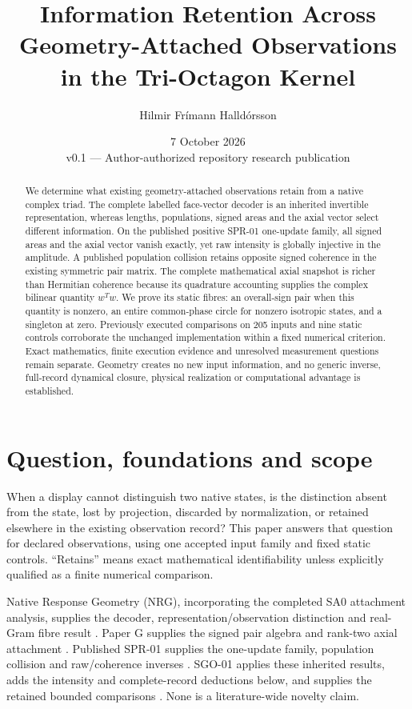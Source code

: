 \documentclass[11pt,a4paper]{article}
\title{\vspace{-12mm}\textbf{Information Retention Across\\Geometry-Attached Observations\\in the Tri-Octagon Kernel}}
\author{Hilmir Fr\'imann Halld\'orsson}
\date{7 October 2026\\\small v0.1 --- Author-authorized repository research publication}
\begin{document}
\maketitle\thispagestyle{fancy}
\begin{abstract}
We determine what existing geometry-attached observations retain from a native complex triad. The complete labelled face-vector decoder is an inherited invertible representation, whereas lengths, populations, signed areas and the axial vector select different information. On the published positive SPR-01 one-update family, all signed areas and the axial vector vanish exactly, yet raw intensity is globally injective in the amplitude. A published population collision retains opposite signed coherence in the existing symmetric pair matrix. The complete mathematical axial snapshot is richer than Hermitian coherence because its quadrature accounting supplies the complex bilinear quantity $w^Tw$. We prove its static fibres: an overall-sign pair when this quantity is nonzero, an entire common-phase circle for nonzero isotropic states, and a singleton at zero. Previously executed comparisons on 205 inputs and nine static controls corroborate the unchanged implementation within a fixed numerical criterion. Exact mathematics, finite execution evidence and unresolved measurement questions remain separate. Geometry creates no new input information, and no generic inverse, full-record dynamical closure, physical realization or computational advantage is established.
\end{abstract}

\section{Question, foundations and scope}\label{sec:scope}
When a display cannot distinguish two native states, is the distinction absent from the state, lost by projection, discarded by normalization, or retained elsewhere in the existing observation record? This paper answers that question for declared observations, using one accepted input family and fixed static controls. ``Retains'' means exact mathematical identifiability unless explicitly qualified as a finite numerical comparison.

Native Response Geometry (NRG), incorporating the completed SA0 attachment analysis, supplies the decoder, representation/observation distinction and real-Gram fibre result \cite{nrg}. Paper G supplies the signed pair algebra and rank-two axial attachment \cite{paperG}. Published SPR-01 supplies the one-update family, population collision and raw/coherence inverses \cite{spr01}. SGO-01 applies these inherited results, adds the intensity and complete-record deductions below, and supplies the retained bounded comparisons \cite{sgo01}. None is a literature-wide novelty claim.
\end{document}

